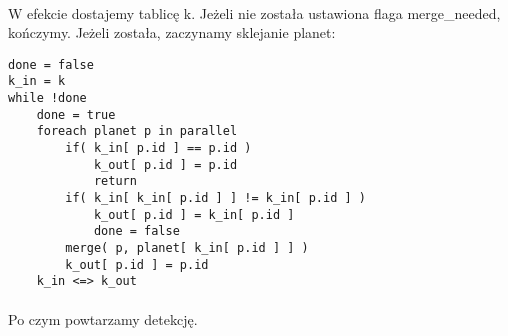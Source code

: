 \paragraph{} W efekcie dostajemy tablicę k. Jeżeli nie została ustawiona flaga merge\_needed, kończymy. Jeżeli została, zaczynamy sklejanie planet:
\begin{lstlisting}
done = false
k_in = k
while !done
	done = true
	foreach planet p in parallel	
		if( k_in[ p.id ] == p.id )
			k_out[ p.id ] = p.id
			return
		if( k_in[ k_in[ p.id ] ] != k_in[ p.id ] )
			k_out[ p.id ] = k_in[ p.id ]
			done = false
		merge( p, planet[ k_in[ p.id ] ] )
		k_out[ p.id ] = p.id
	k_in <=> k_out
\end{lstlisting}

\paragraph{} Po czym powtarzamy detekcję.
